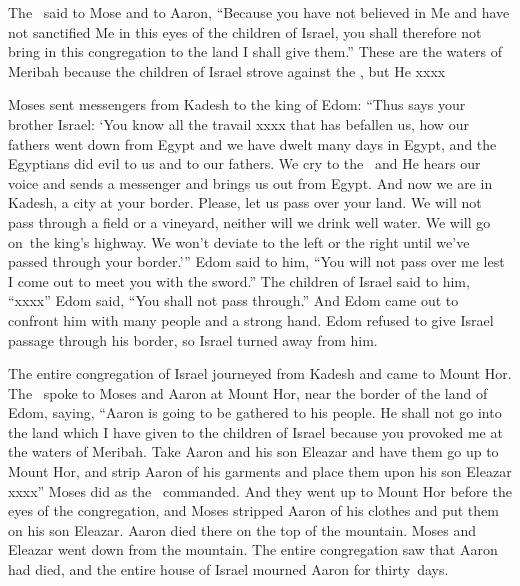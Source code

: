 \begin{inparaenum}
   The \lord\ said to Mose and to Aaron, ``Because you have not believed in Me and have not sanctified Me in this eyes of the children of Israel, you shall therefore not bring in this congregation to the land I shall give them.''%
   These are the waters of Meribah because the children of Israel strove against the \lord, but He xxxx%
  
   Moses sent messengers from Kadesh to the king of Edom: ``Thus says your brother Israel: `You know all the travail xxxx that has befallen us,%
   how our fathers went down from Egypt and we have dwelt many days in Egypt, and the Egyptians did evil to us and to our fathers.%
   We cry to the \lord\ and He hears our voice and sends a messenger and brings us out from Egypt. And now we are in Kadesh, a city at your border.%
   Please, let us pass over your land. We will not pass through a field or a vineyard, neither will we drink well water. We will go on\understood\ the king's highway. We won't deviate to the left or the right until we've passed through your border.'\thinspace''%
   Edom said to him, ``You will not pass over me lest I come out to meet you with the sword.''%
   The children of Israel said to him, ``xxxx''%
   Edom said, ``You shall not pass through.'' And Edom came out to confront him with many people and a strong hand.%
   Edom refused to give Israel passage through his border, so Israel turned away from him.%
  
   The entire congregation of Israel journeyed from Kadesh and came to Mount Hor.%
   The \lord\ spoke to Moses and Aaron at Mount Hor, near the border of the land of Edom, saying,%
   ``Aaron is going to be gathered to his people. He shall not go into the land which I have given to the children of Israel because you provoked me at the waters of Meribah.%
   Take Aaron and his son Eleazar and have them go up to Mount Hor,%
   and strip Aaron of his garments and place them upon his son Eleazar xxxx''%
   Moses did as the \lord\ commanded. And they went up to Mount Hor before the eyes of the congregation,%
   and Moses stripped Aaron of his clothes and put them on his son Eleazar. Aaron died there on the top of the mountain. Moses and Eleazar went down from the mountain.%
   The entire congregation saw that Aaron had died, and the entire house of Israel mourned Aaron for thirty~days.%
\end{inparaenum}
